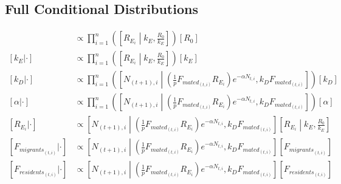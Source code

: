 \documentclass{article}[12pt]
\begin{document}
\subsection*{Full Conditional Distributions}
\begin{align*}
	[R_0 | \cdot] & \propto \prod_{i=1}^{n} \left( \left[ R_{E_i} \middle | k_{E}, \frac{R_{0}}{k_E} \right] \right)[R_0] \\
	[k_E | \cdot] & \propto \prod_{i=1}^{n}\left( \left[ R_{E_i} \middle | k_{E}, \frac{R_{0}}{k_E} \right] \right) \left[k_E \right] \\
	[k_D | \cdot] & \propto \prod_{i=1}^{n}\left( \left[N_{(t+1), i} \middle | \left(\frac{1}{p}F_{{mated}_{(t, i)}}R_{E_i} \right)e^{-\alpha N_{t, i}}, k_DF_{{mated}_{(t, i)}} \right] \right) \left[k_D \right] \\
	[\alpha | \cdot] & \propto \prod_{i=1}^{n}\left( \left[N_{(t+1), i} \middle | \left(\frac{1}{p}F_{{mated}_{(t, i)}}R_{E_i} \right)e^{-\alpha N_{t, i}}, k_DF_{{mated}_{(t, i)}} \right] \right) \left [\alpha \right] \\
	[R_{E_i} | \cdot] & \propto \left[ N_{(t+1), i} \middle | \left(\frac{1}{p}F_{{mated}_{(t, i)}}R_{E_i}\right)e^{-\alpha N_{t, i}}, k_DF_{{mated}_{(t, i)}}\right] \left[ R_{E_i} \middle | k_{E}, \frac{R_{0}}{k_E} \right] \\
	[F_{{migrants}_{(t, i)}} | \cdot] & \propto \left[N_{(t+1), i} \middle | \left(\frac{1}{p}F_{{mated}_{(t, i)}}R_{E_i} \right)e^{-\alpha N_{t, i}}, k_DF_{{mated}_{(t, i)}} \right] \left[F_{{migrants}_{(t, i)}} \right] \\
	[F_{{residents}_{(t, i)}}  | \cdot] & \propto \left[N_{(t+1), i} \middle | \left(\frac{1}{p}F_{{mated}_{(t, i)}}R_{E_i} \right)e^{-\alpha N_{t, i}}, k_DF_{{mated}_{(t, i)}} \right] \left[F_{{residents}_{(t, i)}} \right] 
\end{align*}


\end{document}

